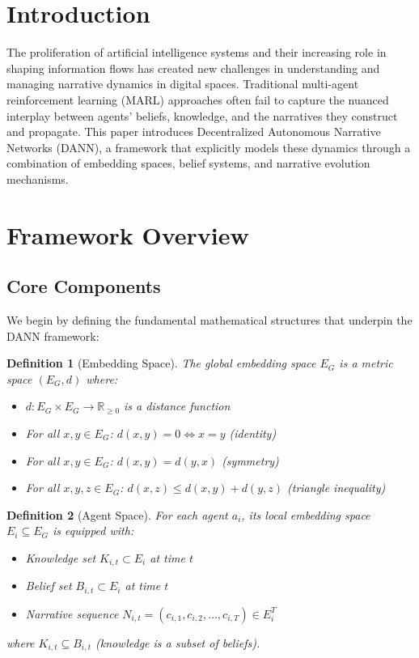 \documentclass[12pt, a4paper]{article}
\newtheorem{definition}{Definition}
\begin{document}
\section{Introduction}
The proliferation of artificial intelligence systems and their increasing role in shaping information flows has created new challenges in understanding and managing narrative dynamics in digital spaces. Traditional multi-agent reinforcement learning (MARL) approaches often fail to capture the nuanced interplay between agents' beliefs, knowledge, and the narratives they construct and propagate. This paper introduces Decentralized Autonomous Narrative Networks (DANN), a framework that explicitly models these dynamics through a combination of embedding spaces, belief systems, and narrative evolution mechanisms.

\section{Framework Overview}
\subsection{Core Components}
We begin by defining the fundamental mathematical structures that underpin the DANN framework:

\begin{definition}[Embedding Space]
The global embedding space $E_G$ is a metric space $(E_G, d)$ where:
\begin{itemize}
    \item $d: E_G \times E_G \rightarrow \mathbb{R}_{\geq 0}$ is a distance function
    \item For all $x,y \in E_G$: $d(x,y) = 0 \iff x = y$ (identity)
    \item For all $x,y \in E_G$: $d(x,y) = d(y,x)$ (symmetry)
    \item For all $x,y,z \in E_G$: $d(x,z) \leq d(x,y) + d(y,z)$ (triangle inequality)
\end{itemize}
\end{definition}

\begin{definition}[Agent Space]
For each agent $a_i$, its local embedding space $E_i \subseteq E_G$ is equipped with:
\begin{itemize}
    \item Knowledge set $K_{i,t} \subset E_i$ at time $t$
    \item Belief set $B_{i,t} \subset E_i$ at time $t$
    \item Narrative sequence $N_{i,t} = (c_{i,1}, c_{i,2}, \dots, c_{i,T}) \in E_i^T$
\end{itemize}
where $K_{i,t} \subseteq B_{i,t}$ (knowledge is a subset of beliefs).
\end{definition}
\end{document}
